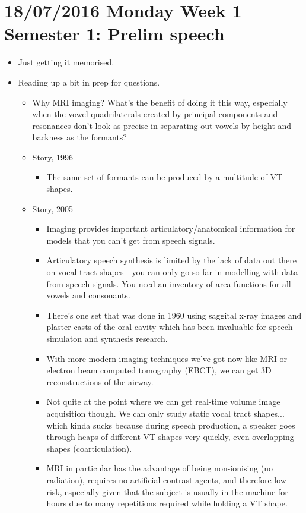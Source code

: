 \documentclass{article}
\begin{document}
\section*{18/07/2016 Monday Week 1 Semester 1: Prelim speech}
\begin{itemize}
    \item Just getting it memorised.
    \item Reading up a bit in prep for questions.
    \begin{itemize}
        \item Why MRI imaging? What's the benefit of doing it this way, especially when the vowel quadrilaterals created by principal components and resonances don't look as precise in separating out vowels by height and backness as the formants?
        \item Story, 1996
        \begin{itemize}
            \item The same set of formants can be produced by a multitude of VT shapes.
        \end{itemize}
        \item Story, 2005
        \begin{itemize}
            \item Imaging provides important articulatory/anatomical information for models that you can't get from speech signals.
            \item Articulatory speech synthesis is limited by the lack of data out there on vocal tract shapes - you can only go so far in modelling with data from speech signals. You need an inventory of area functions for all vowels and consonants.
            \item There's one set that was done in 1960 using saggital x-ray images and plaster casts of the oral cavity which has been invaluable for speech simulaton and synthesis research.
            \item With more modern imaging techniques we've got now like MRI or electron beam computed tomography (EBCT), we can get 3D reconstructions of the airway.
            \item Not quite at the point where we can get real-time volume image acquisition though. We can only study static vocal tract shapes... which kinda sucks because during speech production, a speaker goes through heaps of different VT shapes very quickly, even overlapping shapes (coarticulation).
            \item MRI in particular has the advantage of being non-ionising (no radiation), requires no artificial contrast agents, and therefore low risk, especially given that the subject is usually in the machine for hours due to many repetitions required while holding a VT shape.

\end{itemize}
\end{itemize}
\end{itemize}
\end{document}
